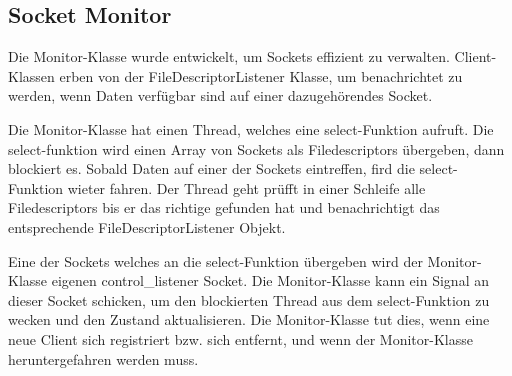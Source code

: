 \subsection{Socket Monitor}

Die Monitor-Klasse wurde entwickelt, um Sockets effizient zu verwalten. Client-Klassen erben von der FileDescriptorListener Klasse, um benachrichtet zu werden, wenn Daten verfügbar sind auf einer dazugehörendes Socket.

Die Monitor-Klasse hat einen Thread, welches eine select-Funktion aufruft. Die select-funktion wird einen Array von Sockets als Filedescriptors übergeben, dann blockiert es. Sobald Daten auf einer der Sockets eintreffen, fird die select-Funktion wieter fahren. Der Thread geht prüfft in einer Schleife alle Filedescriptors bis er das richtige gefunden hat und benachrichtigt das entsprechende FileDescriptorListener Objekt.

Eine der Sockets welches an die select-Funktion übergeben wird der Monitor-Klasse eigenen control\_listener Socket. Die Monitor-Klasse kann ein Signal an dieser Socket schicken, um den blockierten Thread aus dem select-Funktion zu wecken und den Zustand aktualisieren. Die Monitor-Klasse tut dies, wenn eine neue Client sich registriert bzw. sich entfernt, und wenn der Monitor-Klasse heruntergefahren werden muss.